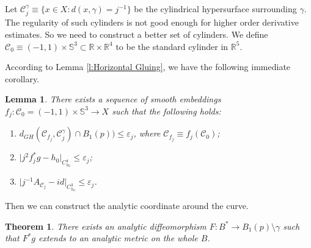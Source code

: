 \documentclass[11pt,reqno]{amsart}
\numberwithin{equation}{section}
\newcommand{\RR}{\mathds{R}}
\newcommand{\cC}{\mathcal{C}}
\newtheorem{theorem}[thm]{Theorem}
\newtheorem{lemma}[thm]{Lemma}
\theoremstyle{definition}
\theoremstyle{remark}
\begin{document}
Let $\cC^\gamma_j \equiv \{ x \in X : d(x, \gamma) = j^{-1} \}$ be the cylindrical hypersurface surrounding $\gamma$. The regularity of such cylinders is not good enough for higher order derivative estimates. So we need to construct a better set of cylinders. We define $\cC_0 \equiv (-1,1) \times \mathbb{S}^3 \subset \RR \times \RR^4$ to be the standard cylinder in $\RR^5$. 


According to Lemma \ref{l:Horizontal Gluing}, we have the following immediate corollary.

\begin{lemma}\label{l:coordinate, appro cylinder}
    There exists a sequence of smooth embeddings $f_j: \cC_0 = (-1,1) \times \mathbb{S}^3 \to X$ such that the following holds:
    \begin{enumerate}
        \item $d_{GH} (\cC_{f_j}, \cC^\gamma_j) \cap B_1(p)) \leqslant \varepsilon_j$, where $\cC_{f_j} \equiv f_j(\cC_0)$;
        \item $\big| j^2 f_j^*g - h_0  \big|_{C^4_{h_0}} \leqslant \varepsilon_j$;
        \item $\big| j^{-1} A_{\cC_j} - id   \big|_{C^3_{h_0}} \leqslant \varepsilon_j$. 
    \end{enumerate}
\end{lemma}

Then we can construct the analytic coordinate around the curve. 
\begin{theorem}\label{t:analytic chart}
    There exists an analytic diffeomorphism $F : B^* \to B_1(p) \setminus \gamma$ such that $F^*g$ extends to an analytic metric on the whole $B$. 
\end{theorem}
\end{document}
